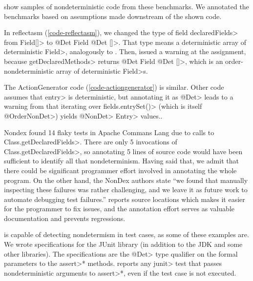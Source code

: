  show samples of nondeterministic code from these
benchmarks.
We annotated the benchmarks based on 
assumptions made downstream of the shown code.

In reflectasm (\cref{code-reflectasm}), we changed the type of field
\<declaredFields> from \<Field[]> to \<@Det Field @Det []>.  That type
means a deterministic array of deterministic \<Field>, analogously to
.  Then, \theDeterminismChecker issued a
warning at the assignment, because \<getDeclaredMethods> returns \<@Det
Field @Det []>, which is an order-nondeterministic array of deterministic
\<Field>s.

The ActionGenerator code (\cref{code-actiongenerator}) is similar.  Other
code assumes that \<entry> is deterministic, but annotating it as \<@Det>
leads to a warning from \theDeterminismChecker that iterating over
\<fields.entrySet()> (which is itself \<@OrderNonDet>) yields \<@NonDet>
\<Entry> values..

Nondex found 14 flaky tests in Apache Commans Lang due to calls
to \<Class.getDeclaredFields>. 
There are only 5 invocations of \<Class.getDeclaredFields>, so annotating 5 lines of source code
would have been sufficient to identify all that nondeterminism.
Having said that, we admit that there could be
significant programmer effort involved in annotating the whole program. On
the other hand, the NonDex authors
state ``we found that manually inspecting these failures was
rather challenging, and we leave it as future work to automate
debugging test failures.''
\TheDeterminismChecker reports source locations
which makes it easier for the programmer to fix issues, and the annotation
effort serves as valuable documentation and prevents regressions.

\TheDeterminismChecker is capable of detecting nondetermism in test
cases, as some of these examples are.
We wrote specifications for the
JUnit library (in addition to the JDK and some other libraries).
The specifications are the \<@Det> type qualifier on the formal parameters
to the \<assert>* methods.
\TheDeterminismChecker reports any \<junit> test that passes nondeterministic arguments to
\<assert>*, even if the test case is not executed.


